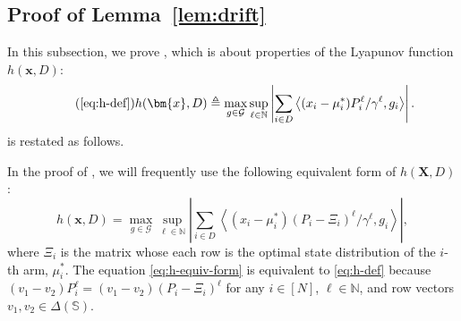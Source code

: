 \documentclass{article}
\theoremstyle{plain}
\theoremstyle{remark}
\newcommand{\abs}[1]{\left\lvert#1\right\rvert}
\newcommand{\mx}{\bm{x}}
\newcommand{\sspa}{\mathbb{S}}
\def\mX{{\bm{X}}}
\newcommand{\innerproduct}[2]{\left\langle #1, #2 \right\rangle}
\begin{document}
\subsection{Proof of Lemma~\ref{lem:drift}}
\label{app:proof-lem-drift}

In this subsection, we prove , which is about properties of the Lyapunov function $h(\mx,D)$:
\begin{equation}\tag{\ref{eq:h-def}}
    h(\mx,D) \triangleq \max_{g\in \mathcal{G}} \sup_{\ell\in\mathbb{N}} \abs{\sum_{i\in D} \innerproduct{(x_i-\mu_i^*) P_i^{\ell} / \gamma^{\ell}}{g_i}}.
\end{equation}
 is restated as follows. 
\hproperties*

In the proof of , we will frequently use the following equivalent form of $h(\mX, D)$:  
\begin{equation}\label{eq:h-equiv-form}
    h(\mx,D) = \max_{g\in \mathcal{G}} \sup_{\ell\in\mathbb{N}} \abs{\sum_{i\in D} \innerproduct{(x_i-\mu_i^*) (P_i - \Xi_i)^{\ell} / \gamma^{\ell}}{g_i}},
\end{equation}
where $\Xi_i$ is the matrix whose each row is the optimal state distribution of the $i$-th arm, $\mu^*_i$. 
The equation \eqref{eq:h-equiv-form} is equivalent to \eqref{eq:h-def} because $(v_1 - v_2) P_i^\ell = (v_1-v_2) (P_i - \Xi_i)^\ell$ for any $i\in [N]$, $\ell \in \mathbb{N}$, and row vectors $v_1, v_2 \in \Delta(\sspa)$. 
\end{document}
